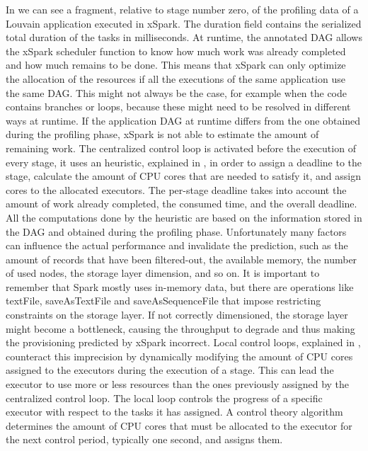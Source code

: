 In  we can see a fragment, relative to stage number zero, of the profiling data of a Louvain application executed in xSpark.
The duration field contains the serialized total duration of the tasks in milliseconds.
At runtime, the annotated DAG allows the xSpark scheduler function to know how much
work was already completed and how much remains to be done. This means that xSpark can only optimize the allocation of the resources if all the executions of the same application use the same DAG. This might not always be the case, for example when the
code contains branches or loops, because these might need to be resolved
in different ways at runtime. If the application DAG at runtime differs from the one obtained during the profiling phase, xSpark is not able to estimate the amount of remaining work.
The centralized control loop is activated before the execution of
every stage, it uses an heuristic, explained in , in order
to assign a deadline to the stage, calculate the amount of CPU cores
that are needed to satisfy it, and assign cores to the allocated executors.
The per-stage deadline takes into account the amount of work
already completed, the consumed time, and the overall deadline. All
the computations done by the heuristic are based on the information
stored in the DAG and obtained during the profiling phase. Unfortunately
many factors can influence the actual performance and
invalidate the prediction, such as the amount of records that have
been filtered-out, the available memory, the number of used nodes,
the storage layer dimension, and so on. It is important to remember
that Spark mostly uses in-memory data, but there are operations like
textFile, saveAsTextFile and saveAsSequenceFile that impose restricting
constraints on the storage layer. If not correctly dimensioned,
the storage layer might become a bottleneck, causing the throughput
to degrade and thus making the provisioning predicted by xSpark
incorrect.
Local control loops, explained in , counteract this imprecision
by dynamically modifying the amount of CPU cores assigned
to the executors during the execution of a stage. This can lead
the executor to use more or less resources than the ones previously
assigned by the centralized control loop. The local loop controls the
progress of a specific executor with respect to the tasks it has assigned.
A control theory algorithm determines the amount of CPU cores that
must be allocated to the executor for the next control period, typically
one second, and assigns them.
